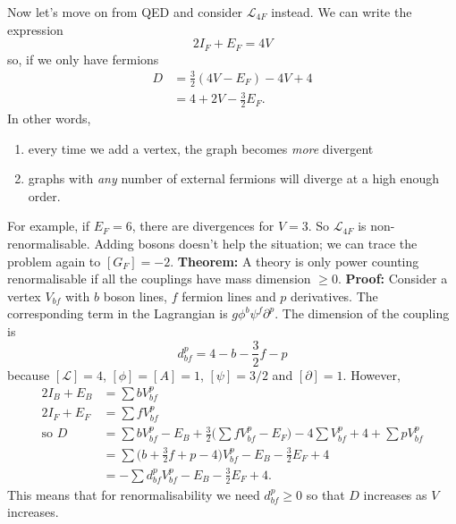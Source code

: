 Now let's move on from QED and consider $\mathcal{L}_{4F}$ instead. We can write the expression
\begin{equation}
2I_F + E_F = 4V
\end{equation}
so, if we only have fermions
\begin{equation}
\begin{split}
D &= \frac{3}{2}(4V-E_F) - 4V + 4 \\
&= 4 + 2V - \frac{3}{2} E_F.
\end{split}
\end{equation}
In other words,
\begin{enumerate}
\item every time we add a vertex, the graph becomes \textit{more} divergent
\item graphs with \textit{any} number of external fermions will diverge at a high enough order.
\end{enumerate}
For example, if $E_F = 6$, there are divergences for $V=3$. So $\mathcal{L}_{4F}$ is non-renormalisable. Adding bosons doesn't help the situation; we can trace the problem again to $[G_F]=-2$. 
\newline
\newline
\textbf{Theorem: } A theory is only power counting renormalisable if all the couplings have mass dimension $\geq 0$.
\newline
\textbf{Proof: } Consider a vertex $V_{bf}$ with $b$ boson lines, $f$ fermion lines and $p$ derivatives. The corresponding term in the Lagrangian is $g\phi^b\psi^f\partial^p$. The dimension of the coupling is
\begin{equation}
d_{bf}^p = 4 - b - \frac{3}{2}f - p
\end{equation}
because $[\mathcal{L}]=4$, $[\phi]=[A]=1$, $[\psi]=3/2$ and $[\partial]=1$. However,
\begin{equation}
\begin{split}
2I_B + E_B &= \sum bV_{bf}^p \\
2I_F + E_F &= \sum fV_{bf}^p \\
\text{so } D &= \sum bV_{bf}^p - E_B + \frac{3}{2}\big(\sum fV_{bf}^p - E_F\big) - 4 \sum V_{bf}^p + 4 + \sum p V_{bf}^p \\
&= \sum\big(b + \frac{3}{2}f + p - 4\big)V_{bf}^p - E_B - \frac{3}{2}E_F + 4 \\
&= -\sum d_{bf}^pV_{bf}^p - E_B - \frac{3}{2}E_F + 4.
\end{split}
\end{equation}
This means that for renormalisability we need $d_{bf}^p \geq 0$ so that $D$ increases as $V$ increases.
